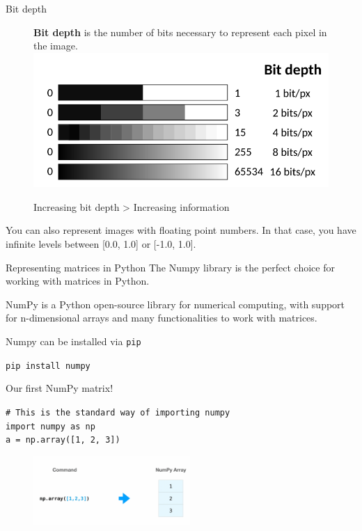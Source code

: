 \documentclass[9pt, aspectratio=169]{beamer}
\begin{document}
\begin{frame}
    {Bit depth}
    \begin{figure}
        \textbf{Bit depth} is the number of bits necessary to represent each pixel in the image.
        \centering
        \includegraphics[width=.6\textwidth]{bitdepth.png}
        \caption{Increasing bit depth > Increasing information}
    \end{figure}
    \pause

    You can also represent images with floating point numbers. In that case, you have infinite levels between [0.0, 1.0] or [-1.0, 1.0].\\    
\end{frame}

\begin{frame}
    {Representing matrices in Python}
    The Numpy library is the perfect choice for working with matrices in Python.

    NumPy is a Python open-source library for numerical computing, with support for n-dimensional arrays and many functionalities to work with matrices.

    Numpy can be installed via \texttt{pip}

    \begin{codebox}
        \texttt{pip install numpy}
    \end{codebox}
\end{frame}

\begin{frame}
    {Our first NumPy matrix!}

    \begin{codebox}
        \texttt{\# This is the standard way of importing numpy\\
            import numpy as np\\
            a = np.array([1, 2, 3])
        }
    \end{codebox}

    \begin{figure}
        \centering
        \includegraphics[height=100px]{np_array.png}
    \end{figure}
\end{frame}
\end{document}
